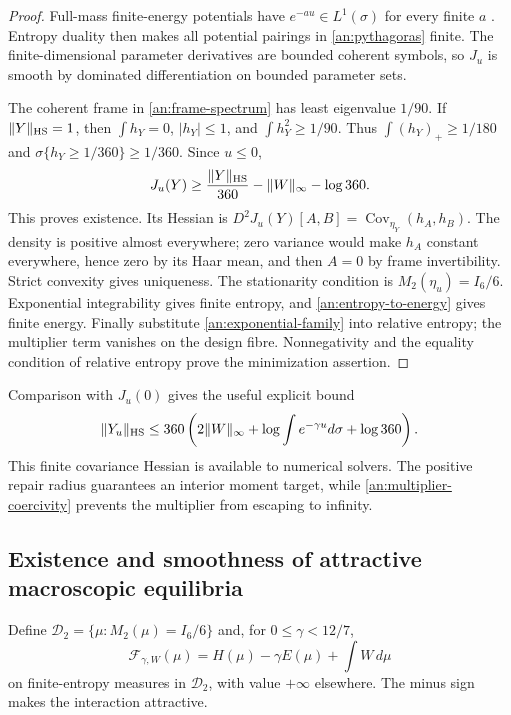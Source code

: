 \begin{proof}
Full-mass finite-energy potentials have $e^{-a u}\in L^1(\sigma)$
for every finite $a$ \citep[Proposition 1.4]{BBEGZ2019}. Entropy duality
then makes all potential pairings in \eqref{an:pythagoras} finite.
The finite-dimensional parameter derivatives are bounded coherent symbols,
so $J_u$ is smooth by dominated differentiation on bounded parameter sets.

The coherent frame in \eqref{an:frame-spectrum} has least eigenvalue
$1/90$. If $\|Y\|_{\rm HS}=1$, then $\int h_Y=0$, $|h_Y|\le1$, and
$\int h_Y^2\ge1/90$. Thus $\int(h_Y)_+\ge1/180$ and
$\sigma\{h_Y\ge1/360\}\ge1/360$. Since $u\le0$,
\begin{equation}
 J_u(Y)\ge\frac{\|Y\|_{\rm HS}}{360}-\|W\|_\infty-\log360.
 \label{an:multiplier-coercivity}
\end{equation}
This proves existence. Its Hessian is
$D^2J_u(Y)[A,B]=\operatorname{Cov}_{\eta_Y}(h_A,h_B)$.
The density is positive almost everywhere; zero variance would make
$h_A$ constant everywhere, hence zero by its Haar mean, and then $A=0$
by frame invertibility. Strict convexity gives uniqueness.
The stationarity condition is $M_2(\eta_u)=I_6/6$.
Exponential integrability gives finite entropy, and
\eqref{an:entropy-to-energy} gives finite energy. Finally substitute
\eqref{an:exponential-family} into relative entropy; the multiplier term
vanishes on the design fibre. Nonnegativity and the equality condition
of relative entropy prove the minimization assertion.
\end{proof}

Comparison with $J_u(0)$ gives the useful explicit bound
\begin{equation}
 \|Y_u\|_{\rm HS}\le360\left(
 2\|W\|_\infty+\log\int e^{-\gamma u}d\sigma+\log360\right).
 \label{an:multiplier-bound}
\end{equation}
This finite covariance Hessian is available to numerical solvers. The
positive repair radius guarantees an interior moment target, while
\eqref{an:multiplier-coercivity} prevents the multiplier from escaping
to infinity.

\subsection{Existence and smoothness of attractive macroscopic equilibria}

Define $\mathcal D_2=\{\mu:M_2(\mu)=I_6/6\}$ and, for
$0\le\gamma<12/7$,
\[
 \mathcal F_{\gamma,W}(\mu)=H(\mu)-\gamma E(\mu)+\int W\,d\mu
\]
on finite-entropy measures in $\mathcal D_2$, with value $+\infty$
elsewhere. The minus sign makes the interaction attractive.

